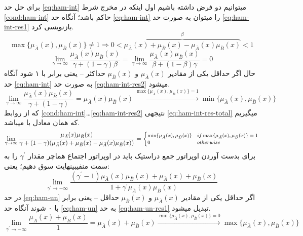 \documentclass[10pt,a4paper]{article}
\newcommand{\نیمفاصله}{\halfspace}
\renewcommand{\ }{\halfspace}
\newcommand{\mba}{\mu_{\bar{A}}}
\newcommand{\mbb}{\mu_{\bar{B}}}
\begin{document}
برای حل حد
\ref{eq:ham-int}
می\ توانیم دو فرض داشته باشیم اول اینکه در مخرج شرط
\ref{cond:ham-int}
 حاکم باشد؛ آنگاه حد
\ref{eq:ham-int}
را می\ توان به صورت حد
\ref{eq:ham-int-res1}
بازنویسی کرد.
\begin{equation}
\max\{\mba(x),\mbb(x)\} \neq 1 \Longrightarrow 0 < \overbrace{\mba(x) + \mbb(x) - \mba(x)\mbb(x)} ^ \beta < 1
\label{cond:ham-int}
\end{equation}
\begin{equation}
\lim_{\gamma \rightarrow \infty} \frac{\mba(x)\mbb(x)}{\gamma + (1-\gamma)\beta} = 
\lim_{\gamma \rightarrow \infty} \frac{\mba(x)\mbb(x)}{\beta + (1 - \beta)\gamma} = 0 
\label{eq:ham-int-res1}
\end{equation}
حال اگر حداقل یکی از مقادیر
$\mba(x)$ و $\mbb(x)$
حداکثر -- یعنی برابر با ۱ شود آنگاه حد
\ref{eq:ham-int}
به صورت حد
\ref{eq:ham-int-res2}
می\ شود.
\begin{equation}
\lim_{\gamma \rightarrow \infty} \frac{\mba(x)\mbb(x)}{\gamma + (1-\gamma)} = \mba(x)\mbb(x)
\xrightarrow{\max\{\mba(x),\mbb(x)\} = 1} \min\{\mba(x),\mbb(x)\}
\label{eq:ham-int-res2}
\end{equation}
که از روابط
\ref{cond:ham-int}\ldots\ref{eq:ham-int-res2}
نتیجه\ ی
\ref{eq:ham-int-res-total}
می\ گیریم که همان معادل با
می\ باشد.
\begin{equation}\footnotesize
\lim_{\gamma \rightarrow \infty} \frac{\mba(x)\mbb(x)}{\gamma + (1-\gamma)(\mba(x) + \mbb(x) - \mba(x)\mbb(x))} = \begin{cases}
\min\{\mba(x),\mbb(x)\} & if \max\{\mba(x),\mbb(x)\} = 1\\
0 & otherwise
\end{cases}
\label{eq:ham-int-res-total}
\end{equation}
برای بدست آوردن اوپراتور جمع دراستیک باید در اوپراتور اجتماع هماچر مقدار $\gamma ^ \prime$ را به سمت منفی\ بی\ نهایت سوق دهیم؛ یعنی:
\begin{equation}
\lim_{\gamma^\prime \rightarrow -\infty} \frac{(\gamma^\prime - 1)\mba(x)\mbb(x) + \mba(x) + \mbb(x)}{1+\gamma^\prime\mba(x)\mbb(x)}
\label{eq:ham-un}
\end{equation}
در حد
\ref{eq:ham-un}
اگر حداقل یکی از مقادیر
$\mba(x)$ و $\mbb(x)$
حداقل -- یعنی برابر با ۰ شوند آنگاه حد
\ref{eq:ham-un}
به حد
\ref{eq:ham-un-res1}
تبدیل می\ شود.
\begin{equation}
\lim_{\gamma^\prime \rightarrow -\infty} \frac{\mba(x) + \mbb(x)}{1} = \mba(x) + \mbb(x) \xrightarrow{\min\{\mba(x),\mbb(x)\} = 0} \max\{\mba(x),\mbb(x)\}
\label{eq:ham-un-res1}
\end{equation}
\end{document}
